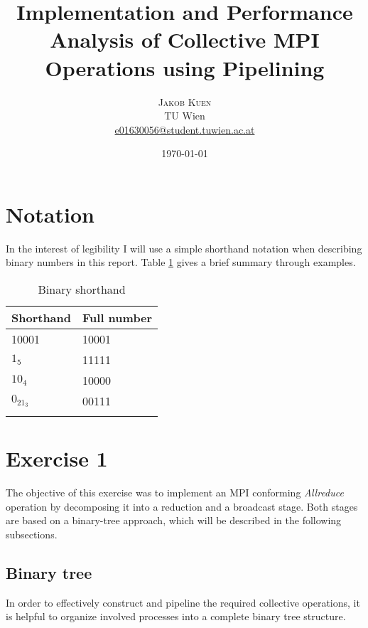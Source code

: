 \documentclass[twoside,twocolumn,hidelinks]{article}
\title{Implementation and Performance Analysis of Collective MPI Operations using Pipelining} %
\author{%
\textsc{Jakob Kuen} \\[1ex] %
\normalsize TU Wien \\ %
\normalsize \href{mailto:e01630056@student.tuwien.ac.at}{e01630056@student.tuwien.ac.at} %
}
\date{\today} %
\begin{document}
\nocite{*}

\maketitle


\section*{Notation}
In the interest of legibility I will use a simple shorthand notation when describing binary numbers in this report. Table \ref{tab:binary_shorthand} gives a brief summary through examples.

\begin{table}[h]
      \centering
      \begin{tabular}{ll}
            \toprule
            Shorthand & Full number \\
            \midrule
            10001    & 10001 \\
            $1_5$    & 11111  \\
            $10_4$   & 10000  \\
            $0_21_3$ & 00111  \\
            \bottomrule
            \label{tab:binary_shorthand}
      \end{tabular}
      \caption{Binary shorthand}
\end{table}

\section{Exercise 1}
The objective of this exercise was to implement an MPI conforming \textit{Allreduce} \cite{mpi_allreduce} operation by decomposing it into a reduction and a broadcast stage. Both stages are based on a binary-tree approach, which will be described in the following subsections.

\subsection{Binary tree}\label{sec:binary_tree}
In order to effectively construct and pipeline the required collective operations, it is helpful to organize involved processes into a complete binary tree structure. 
\end{document}
